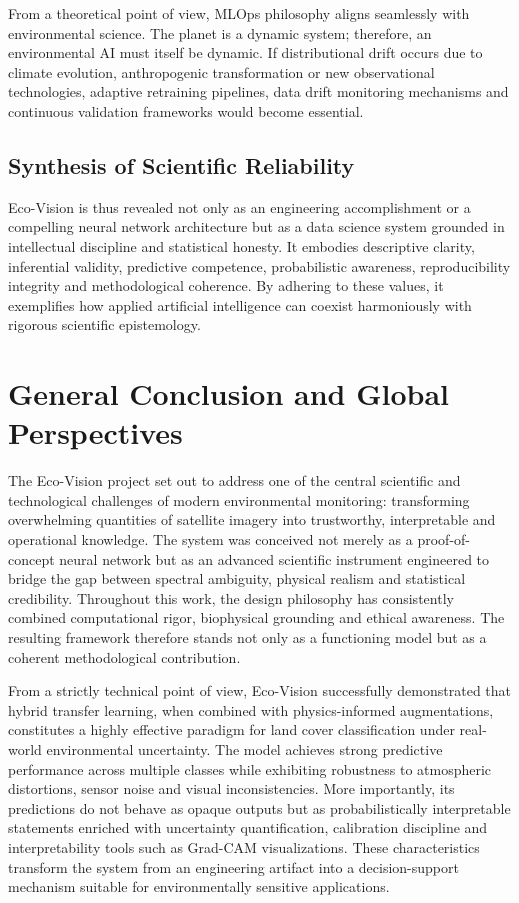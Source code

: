 \documentclass[12pt,a4paper]{report}
\begin{document}
From a theoretical point of view, MLOps philosophy aligns seamlessly with environmental science. The planet is a dynamic system; therefore, an environmental AI must itself be dynamic. If distributional drift occurs due to climate evolution, anthropogenic transformation or new observational technologies, adaptive retraining pipelines, data drift monitoring mechanisms and continuous validation frameworks would become essential.

\section{Synthesis of Scientific Reliability}

Eco-Vision is thus revealed not only as an engineering accomplishment or a compelling neural network architecture but as a data science system grounded in intellectual discipline and statistical honesty. It embodies descriptive clarity, inferential validity, predictive competence, probabilistic awareness, reproducibility integrity and methodological coherence. By adhering to these values, it exemplifies how applied artificial intelligence can coexist harmoniously with rigorous scientific epistemology.

\newpage

\chapter{General Conclusion and Global Perspectives}

The Eco-Vision project set out to address one of the central scientific and technological challenges of modern environmental monitoring: transforming overwhelming quantities of satellite imagery into trustworthy, interpretable and operational knowledge. The system was conceived not merely as a proof-of-concept neural network but as an advanced scientific instrument engineered to bridge the gap between spectral ambiguity, physical realism and statistical credibility. Throughout this work, the design philosophy has consistently combined computational rigor, biophysical grounding and ethical awareness. The resulting framework therefore stands not only as a functioning model but as a coherent methodological contribution.

From a strictly technical point of view, Eco-Vision successfully demonstrated that hybrid transfer learning, when combined with physics-informed augmentations, constitutes a highly effective paradigm for land cover classification under real-world environmental uncertainty. The model achieves strong predictive performance across multiple classes while exhibiting robustness to atmospheric distortions, sensor noise and visual inconsistencies. More importantly, its predictions do not behave as opaque outputs but as probabilistically interpretable statements enriched with uncertainty quantification, calibration discipline and interpretability tools such as Grad-CAM visualizations. These characteristics transform the system from an engineering artifact into a decision-support mechanism suitable for environmentally sensitive applications.
\end{document}
